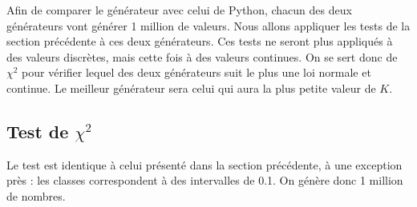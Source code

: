 \documentclass[10pt,a4paper]{article}
\begin{document}
Afin de comparer le générateur avec celui de Python, chacun des deux générateurs vont générer 1 million de valeurs. Nous allons appliquer les tests de la section précédente à ces deux générateurs. Ces tests ne seront plus appliqués à des valeurs discrètes, mais cette fois à des valeurs continues. On se sert donc de $\chi^2$ pour vérifier lequel des deux générateurs suit le plus une loi normale et continue. Le meilleur générateur sera celui qui aura la plus petite valeur de $K$.

\subsection{Test de $\chi^2$}

Le test est identique à celui présenté dans la section précédente, à une exception près : les classes correspondent à des intervalles de 0.1. On génère donc 1 million de nombres.

\begin{figure}[H]
\label{couponshisto}
\end{figure}

\end{document}
